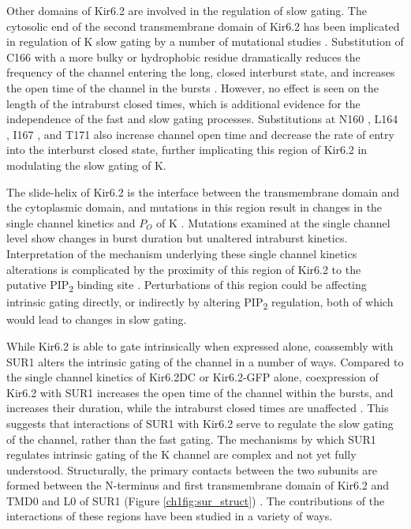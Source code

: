Other domains of Kir6.2 are involved in the regulation of slow gating.
The cytosolic end of the second transmembrane domain of Kir6.2 has been implicated in regulation of K\ATP{} slow gating by a number of mutational studies \cite{shyng_control_1997, tucker_molecular_1998, trapp_molecular_1998-1, loussouarn_structure_2000}.
Substitution of C166 with a more bulky or hydrophobic residue dramatically reduces the frequency of the channel entering the long, closed interburst state, and increases the open time of the channel in the bursts \cite{trapp_molecular_1998-1}.
However, no effect is seen on the length of the intraburst closed times, which is additional evidence for the independence of the fast and slow gating processes.
Substitutions at N160 \cite{shyng_control_1997}, L164 \cite{tammaro_kir62_2008}, I167 \cite{tucker_molecular_1998}, and T171 \cite{tucker_molecular_1998, drain_katp_1998} also increase channel open time and decrease the rate of entry into the interburst closed state, further implicating this region of Kir6.2 in modulating the slow gating of K\ATP{}.

The slide-helix of Kir6.2 is the interface between the transmembrane domain and the cytoplasmic domain, and mutations in this region result in changes in the single channel kinetics and $P_O$ of K\ATP{} \cite{proks_molecular_2004, koster_dend_2008, mannikko_interaction_2010, li_decomposition_2013,cooper_conserved_2017}.
Mutations examined at the single channel level show changes in burst duration \cite{proks_molecular_2004, koster_dend_2008, mannikko_interaction_2010} but unaltered intraburst kinetics.
Interpretation of the mechanism underlying these single channel kinetics alterations is complicated by the proximity of this region of Kir6.2 to the putative PIP\textsubscript{2} binding site \cite{pipatpolkai_evaluating_2020}.
Perturbations of this region could be affecting intrinsic gating directly, or indirectly by altering PIP\textsubscript{2} regulation, both of which would lead to changes in slow gating.

While Kir6.2 is able to gate intrinsically when expressed alone, coassembly with SUR1 alters the intrinsic gating of the channel in a number of ways.
Compared to the single channel kinetics of Kir6.2\textgreek{D}C or Kir6.2-GFP alone, coexpression of Kir6.2 with SUR1 increases the open time of the channel within the bursts, and increases their duration, while the intraburst closed times are unaffected \cite{trapp_molecular_1998-1, john_sulphonylurea_1998-1, chan_n-terminal_2003-1}.
This suggests that interactions of SUR1 with Kir6.2 serve to regulate the slow gating of the channel, rather than the fast gating.
The mechanisms by which SUR1 regulates intrinsic gating of the K\ATP{} channel are complex and not yet fully understood.
Structurally, the primary contacts between the two subunits are formed between the N-terminus and first transmembrane domain of Kir6.2 and TMD0 and L0 of SUR1 (Figure \ref{ch1fig:sur_struct}) \cite{martin_anti-diabetic_2017, lee_molecular_2017-1, li_structure_2017-1}.
The contributions of the interactions of these regions have been studied in a variety of ways.

